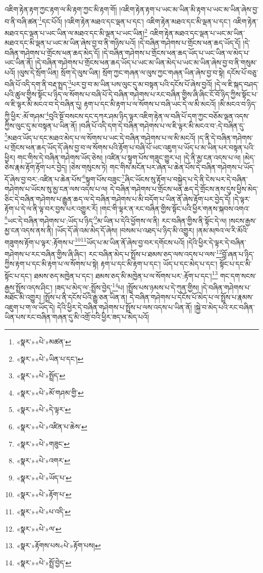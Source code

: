 འཇིག་རྟེན་རྟག་ཀྱང་རྟག་ལ་མི་རྟག་ཀྱང་མི་རྟག་གོ། །འཇིག་རྟེན་རྟག་པ་ཡང་མ་ཡིན་མི་རྟག་པ་ཡང་མ་ཡིན་ཞེས་བྱ་བ་ནི་བཞི་ཚན་\footnote{«སྣར་»«པེ་»མཚན་}དང་པོའོ། །འཇིག་རྟེན་མཐའ་དང་ལྡན་པ་དང་། འཇིག་རྟེན་མཐའ་དང་མི་ལྡན་པ་དང་། འཇིག་རྟེན་མཐའ་དང་ལྡན་པ་ཡང་ཡིན་ལ་མཐའ་དང་མི་ལྡན་པ་ཡང་ཡིན།\footnote{«སྣར་»«པེ་»ཡིན་པ་དང་།} འཇིག་རྟེན་མཐའ་དང་ལྡན་པ་ཡང་མ་ཡིན་མཐའ་དང་མི་ལྡན་པ་ཡང་མ་ཡིན་ཞེས་བྱ་བ་ནི་གཉིས་པའོ། །དེ་བཞིན་གཤེགས་པ་གྲོངས་ཕན་ཆད་ཡོད་དོ། །དེ་བཞིན་གཤེགས་པ་གྲོངས་ཕན་ཆད་མེད་དོ། །དེ་བཞིན་གཤེགས་པ་གྲོངས་ཕན་ཆད་ཡོད་པ་ཡང་ཡིན་ལ་མེད་པ་ཡང་ཡིན་ནོ། །དེ་བཞིན་གཤེགས་པ་གྲོངས་ཕན་ཆད་ཡོད་པ་ཡང་མ་ཡིན་མེད་པ་ཡང་མ་ཡིན་ཞེས་བྱ་བ་ནི་གསུམ་པའོ། །ལུས་དེ་སྲོག་ཡིན། སྲོག་དེ་ལུས་ཡིན། སྲོག་ཀྱང་གཞན་ལ་ལུས་ཀྱང་གཞན་ཡིན་ཞེས་བྱ་བ་སྟེ། དངོས་པོ་བཅུ་བཞི་པོ་འདི་དག་ནི་བརྡ་སྤྲད་\footnote{«སྣར་»«པེ་»སྤྲོད་}པར་བྱ་བ་མ་ཡིན་པས་ལུང་དུ་མ་བསྟན་པའི་དངོས་པོ་ཞེས་བྱའོ། །དེ་ལ་ཇི་སྐད་བཤད་པའི་ཚུལ་གྱིས་སྟོང་པ་ཉིད་ལ་སོགས་པ་བཞི་པོ་དེ་བཞིན་གཤེགས་པ་རང་བཞིན་གྱིས་ཞི་ཞིང་ངོ་བོ་ཉིད་ཀྱིས་སྟོང་པ་ལ་ཇི་ལྟར་མི་མངའ་བ་དེ་བཞིན་དུ། རྟག་པ་དང་མི་རྟག་པ་ལ་སོགས་པ་བཞི་ཡང་དེ་ལ་མི་མངའོ། །མི་མངའ་བ་ཉིད་ཀྱི་ཕྱིར་:མོ་གཤམ་\footnote{«སྣར་»«པེ་»མོ་གཤམ་གྱི་}བུའི་སྔོ་བསངས་དང་དཀར་ཤམ་ཉིད་ལྟར་འཇིག་རྟེན་ལ་བཞི་པོ་དག་ཀྱང་བཅོམ་ལྡན་འདས་ཀྱིས་ལུང་དུ་མ་བསྟན་པ་ཡིན་ནོ། །བཞི་པོ་འདི་དག་དེ་བཞིན་གཤེགས་པ་ལ་ཇི་ལྟར་མི་མངའ་བ་:དེ་བཞིན་དུ་\footnote{«སྣར་»«པེ་»དེ་ལྟར་}མཐའ་ཡོད་པ་དང་མཐའ་མེད་པ་ལ་སོགས་པ་ཡང་དེ་བཞིན་གཤེགས་པ་ལ་མི་མངའོ། །ད་ནི་དེ་བཞིན་གཤེགས་པ་གྲོངས་ཕན་ཆད་ཡོད་དོ་ཞེས་བྱ་བ་ལ་སོགས་པའི་རྟོག་པ་བཞི་པོ་ཡང་འཇུག་པ་ཡོད་པ་མ་ཡིན་པར་བསྟན་པའི་ཕྱིར། གང་གིས་དེ་བཞིན་གཤེགས་ཡོད་ཅེས། །འཛིན་པ་སྟུག་པོས་གཟུང་གྱུར་པ། །དེ་ནི་མྱ་ངན་འདས་པ་ལ། །མེད་ཅེས་རྣམ་རྟོག་རྟོག་པར་བྱེད། །ཅེས་གསུངས་ཏེ། གང་གིས་མངོན་པར་ཞེན་པ་ཆེན་པོས་དེ་བཞིན་གཤེགས་པ་ཡོད་དོ་ཞེས་བྱ་བར་:འཛིན་པ་ཆེན་པོས་\footnote{«སྣར་»«པེ་»འཛིན་པ་ཆེས་}སྟུག་པོས་བཟུང་\footnote{«སྣར་»«པེ་»གཟུང་}ཞིང་ཡོངས་སུ་རྟོག་པ་བསྐྱེད་པ་དེ་ནི་ངེས་པར་དེ་བཞིན་གཤེགས་པ་ཡོངས་སུ་མྱ་ངན་ལས་འདས་པ་ལ། དེ་བཞིན་གཤེགས་པ་གྲོངས་ཕན་ཆད་དེ་གྲོངས་ནས་དུས་ཕྱིས་མེད་ཅིང་དེ་བཞིན་གཤེགས་པ་རྒྱུན་ཆད་ལ་དེ་བཞིན་གཤེགས་པ་མི་བདོག་པ་ཡིན་ནོ་ཞེས་རྟོག་པར་བྱེད་དོ། །དེ་ལྟར་རྟོག་པ་དེ་ལ་ནི་ལྟ་བར་བྱས་པར་འགྱུར་རོ། །གང་གི་ལྟར་ན་རང་བཞིན་གྱིས་སྟོང་པའི་ཕྱིར་གནས་སྐབས་འགའ་\footnote{«སྣར་»«པེ་»འགར་}ཡང་དེ་བཞིན་གཤེགས་པ་:ཡོད་པ་ཉིད་\footnote{«སྣར་»«པེ་»ཡོད་པ་}མ་ཡིན་པ་དེའི་ཕྱོགས་ལ་ནི། རང་བཞིན་གྱིས་ནི་སྟོང་དེ་ལ། །སངས་རྒྱས་མྱ་ངན་འདས་ནས་ནི། །ཡོད་དོ་ཞེ་འམ་མེད་དོ་ཞེས། །བསམ་པ་འཐད་པ་ཉིད་མི་འགྱུར། །ནམ་མཁའ་ལ་རི་མོའི་གཟུགས་རྟོག་པ་ལྟར་:རྟོགས་པ་\footnote{«སྣར་»«པེ་»རྟོག་པ་}\footnote{«སྣར་»«པེ་»པ་འདི་}ཡོད་པ་མ་ཡིན་ནོ་ཞེས་བྱ་བར་དགོངས་པའོ། །དེའི་ཕྱིར་དེ་ལྟར་དེ་བཞིན་གཤེགས་པ་རང་བཞིན་གྱིས་ཞི་ཞིང་། རང་བཞིན་མེད་པ་སྤྲོས་པ་ཐམས་ཅད་ལས་འདས་པ་ལས་\footnote{«སྣར་»«པེ་»ལ་}བློ་ཞན་པ་ཉིད་ཀྱིས་རྟག་པ་དང་མི་རྟག་པ་ལ་སོགས་པ་སྟེ། རྟག་པ་དང་མི་རྟག་པ་དང་། ཡོད་པ་དང་མེད་པ་དང་། སྟོང་པ་དང་མི་སྟོང་པ་དང་། ཐམས་ཅད་མཁྱེན་པ་དང་། ཐམས་ཅད་མི་མཁྱེན་པ་ལ་སོགས་པར་:རྟོག་པ་དང་།\footnote{«སྣར་»རྟོགས་པས«པེ་»རྟོག་པས།} གང་དག་སངས་རྒྱས་སྤྲོས་འདས་ཤིང་། །ཟད་པ་མེད་ལ་:སྤྲོས་བྱེད་\footnote{«སྣར་»«པེ་»སྤྲོ་བྱེད་}པ། །སྤྲོས་པས་ཉམས་པ་དེ་ཀུན་གྱིས། །དེ་བཞིན་གཤེགས་པ་མཐོང་མི་འགྱུར། །སྤྲོས་པ་ནི་དངོས་པོའི་རྒྱུ་ཅན་ཡིན་ན། དེ་བཞིན་གཤེགས་པ་དངོས་པོ་མེད་པ་ལ་སྤྲོས་པ་རྣམས་འཇུག་པ་ག་ལ་ཡོད་དེ། དེའི་ཕྱིར་དེ་བཞིན་གཤེགས་པ་སྤྲོས་པ་ལས་འདས་པ་ཡིན་ནོ། །སྐྱེ་བ་མེད་པའི་རང་བཞིན་ཡིན་པས་རང་བཞིན་གཞན་དུ་མི་འགྲོ་བའི་ཕྱིར་ཟད་པ་མེད་པའོ། 